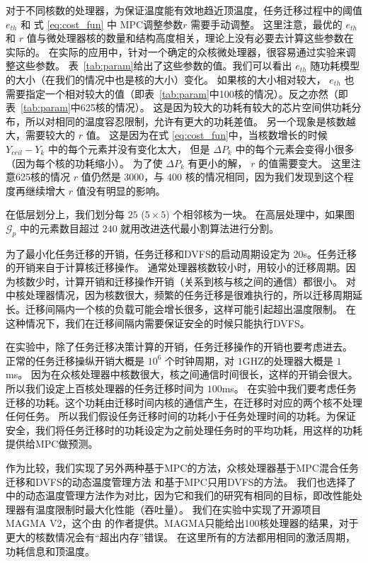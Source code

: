 对于不同核数的处理器，为保证温度能有效地趋近顶温度，任务迁移过程中的阈值 $e_{th}$ 和 式 \eqref{eq:cost_fun} 中 MPC调整参数$r$ 需要手动调整。
这里注意，最优的 $e_{th}$ 和 $r$ 值与微处理器核的数量和结构高度相关，理论上没有必要去计算这些参数在实际的。
在实际的应用中，针对一个确定的众核微处理器，很容易通过实验来调整这些参数。
表~\ref{tab:param}给出了这些参数的值。我们可以看出 $e_{th}$ 随功耗模型的大小（在我们的情况中也是核的大小）变化。
如果核的大小相对较大， $e_{th}$ 也需要指定一个相对较大的值（即表~\ref{tab:param}中100核的情况）。反之亦然（即表~\ref{tab:param}中625核的情况）。
这是因为较大的功耗有较大的芯片空间供功耗分布，所以对相同的温度容忍限制，允许有更大的功耗差值。
另一个现象是核数越大，需要较大的 $r$ 值。
这是因为在式 \eqref{eq:cost_fun}中，当核数增长的时候$Y_{ceil}-Y_k$ 中的每个元素并没有变化太大，
但是 $\Delta P_k$ 中的每个元素会变得小很多（因为每个核的功耗缩小）。
为了使 $\Delta P_k$ 有更小的解， $r$ 的值需要变大。
这里注意625核的情况 $r$ 值仍然是 $3000$，与 $400$ 核的情况相同，因为我们发现到这个程度再继续增大 $r$ 值没有明显的影响。

在低层划分上，我们划分每 $25$ ($5 \times 5$) 个相邻核为一块。
在高层处理中，如果图 $\mathcal{G}_p$ 中的元素数目超过 $240$ 就用改进迭代最小割算法进行分割。

为了最小化任务迁移的开销，任务迁移和DVFS的启动周期设定为 $20$s。任务迁移的开销来自于计算核迁移操作。
通常处理器核数较小时，用较小的迁移周期。因为核数少时，计算开销和迁移操作开销（关系到核与核之间的通信）都很小。
对中核处理器情况，因为核数很大，频繁的任务迁移是很难执行的，所以迁移周期延长。迁移间隔内一个核的负载可能会增长很多，这样可能引起超出温度限制。
在这种情况下，我们在迁移间隔内需要保证安全的时候只能执行DVFS。

在实验中，除了任务迁移决策计算的开销，任务迁移操作的开销也要考虑进去。
正常的任务迁移操纵开销大概是 $10^6$ 个时钟周期，对 $1$GHZ的处理器大概是 $1$ms\cite{Cuesta:ISVLSI'10}。
因为在众核处理器中核数很大，核之间通信时间很长，这样的开销会很大。
所以我们设定上百核处理器的任务迁移时间为 $100$ms。
在实验中我们要考虑任务迁移的功耗。这个功耗由迁移时间内核的通信产生，在迁移时对应的两个核不处理任何任务。
所以我们假设任务迁移时间的功耗小于任务处理时间的功耗。为保证安全，我们将任务迁移时的功耗设定为之前处理任务时的平均功耗，用这样的功耗提供给MPC做预测。

作为比较，我们实现了另外两种基于MPC的方法，众核处理器基于MPC混合任务迁移和DVFS的动态温度管理方法 \cite{MaWang:APCCAS'14}和基于MPC只用DVFS的方法。
我们也选择了 \cite{Hanumaiah:TCAD'11}中的动态温度管理方法作为对比，因为它和我们的研究有相同的目标，即改性能处理器有温度限制时最大化性能（吞吐量）。
我们在实验中实现了开源项目 MAGMA V2，这个由 \cite{Hanumaiah:TCAD'11}的作者提供。MAGMA只能给出100核处理器的结果，对于更大的核数情况会有“超出内存”错误。
在这里所有的方法都用相同的激活周期，功耗信息和顶温度。

